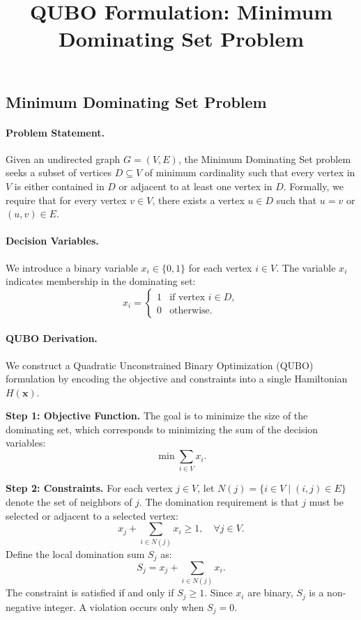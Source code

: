 \documentclass[12pt]{article}
\title{QUBO Formulation: Minimum Dominating Set Problem}
\date{}
\begin{document}
\maketitle

\subsection*{Minimum Dominating Set Problem}

\paragraph{Problem Statement.}
Given an undirected graph $G = (V, E)$, the Minimum Dominating Set problem seeks a subset of vertices $D \subseteq V$ of minimum cardinality such that every vertex in $V$ is either contained in $D$ or adjacent to at least one vertex in $D$. Formally, we require that for every vertex $v \in V$, there exists a vertex $u \in D$ such that $u = v$ or $(u, v) \in E$.

\paragraph{Decision Variables.}
We introduce a binary variable $x_i \in \{0, 1\}$ for each vertex $i \in V$. The variable $x_i$ indicates membership in the dominating set:
\[
x_i = \begin{cases}
1 & \text{if vertex } i \in D, \\
0 & \text{otherwise}.
\end{cases}
\]

\paragraph{QUBO Derivation.}
We construct a Quadratic Unconstrained Binary Optimization (QUBO) formulation by encoding the objective and constraints into a single Hamiltonian $H(\mathbf{x})$.

\textbf{Step 1: Objective Function.}
The goal is to minimize the size of the dominating set, which corresponds to minimizing the sum of the decision variables:
\begin{equation}
\min \sum_{i \in V} x_i.
\end{equation}

\textbf{Step 2: Constraints.}
For each vertex $j \in V$, let $N(j) = \{ i \in V \mid (i, j) \in E \}$ denote the set of neighbors of $j$. The domination requirement is that $j$ must be selected or adjacent to a selected vertex:
\begin{equation}
x_j + \sum_{i \in N(j)} x_i \ge 1, \quad \forall j \in V.
\end{equation}
Define the local domination sum $S_j$ as:
\begin{equation}
S_j = x_j + \sum_{i \in N(j)} x_i.
\end{equation}
The constraint is satisfied if and only if $S_j \ge 1$. Since $x_i$ are binary, $S_j$ is a non-negative integer. A violation occurs only when $S_j = 0$.
\end{document}
